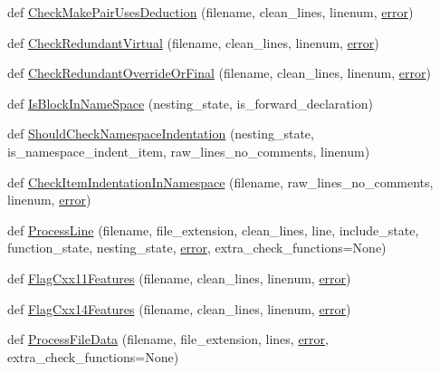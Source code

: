 \begin{DoxyCompactItemize}
\item 
def \hyperlink{namespacecpplint_add392d0ab0e8bcfeea6d02410229a0cc}{Check\+Make\+Pair\+Uses\+Deduction} (filename, clean\+\_\+lines, linenum, \hyperlink{_07copy_08_2_read_camera_model_8m_ac546fdc9911f4a876dbfaffbc7426f8b}{error})
\item 
def \hyperlink{namespacecpplint_a828985bee0575cfbb64212db74b61d9a}{Check\+Redundant\+Virtual} (filename, clean\+\_\+lines, linenum, \hyperlink{_07copy_08_2_read_camera_model_8m_ac546fdc9911f4a876dbfaffbc7426f8b}{error})
\item 
def \hyperlink{namespacecpplint_ab4f9b0390c702f149cec4030901d249d}{Check\+Redundant\+Override\+Or\+Final} (filename, clean\+\_\+lines, linenum, \hyperlink{_07copy_08_2_read_camera_model_8m_ac546fdc9911f4a876dbfaffbc7426f8b}{error})
\item 
def \hyperlink{namespacecpplint_a618e046738f246f01972bce339ee5d49}{Is\+Block\+In\+Name\+Space} (nesting\+\_\+state, is\+\_\+forward\+\_\+declaration)
\item 
def \hyperlink{namespacecpplint_aaaeb792789007d86b0898676c00caa72}{Should\+Check\+Namespace\+Indentation} (nesting\+\_\+state, is\+\_\+namespace\+\_\+indent\+\_\+item, raw\+\_\+lines\+\_\+no\+\_\+comments, linenum)
\item 
def \hyperlink{namespacecpplint_ac8e3b4340d0d83c8b2e7b199597b29a0}{Check\+Item\+Indentation\+In\+Namespace} (filename, raw\+\_\+lines\+\_\+no\+\_\+comments, linenum, \hyperlink{_07copy_08_2_read_camera_model_8m_ac546fdc9911f4a876dbfaffbc7426f8b}{error})
\item 
def \hyperlink{namespacecpplint_a0982264a7b4f297b634fbc813d6a856e}{Process\+Line} (filename, file\+\_\+extension, clean\+\_\+lines, line, include\+\_\+state, function\+\_\+state, nesting\+\_\+state, \hyperlink{_07copy_08_2_read_camera_model_8m_ac546fdc9911f4a876dbfaffbc7426f8b}{error}, extra\+\_\+check\+\_\+functions=None)
\item 
def \hyperlink{namespacecpplint_a386f43855367cc82348b0e2834e5cdc0}{Flag\+Cxx11\+Features} (filename, clean\+\_\+lines, linenum, \hyperlink{_07copy_08_2_read_camera_model_8m_ac546fdc9911f4a876dbfaffbc7426f8b}{error})
\item 
def \hyperlink{namespacecpplint_a744a4eecd461be0235779b03d34d6daf}{Flag\+Cxx14\+Features} (filename, clean\+\_\+lines, linenum, \hyperlink{_07copy_08_2_read_camera_model_8m_ac546fdc9911f4a876dbfaffbc7426f8b}{error})
\item 
def \hyperlink{namespacecpplint_a8ecdd81734dffbe90b22728f8343d92e}{Process\+File\+Data} (filename, file\+\_\+extension, lines, \hyperlink{_07copy_08_2_read_camera_model_8m_ac546fdc9911f4a876dbfaffbc7426f8b}{error}, extra\+\_\+check\+\_\+functions=None)

\end{DoxyCompactItemize}
